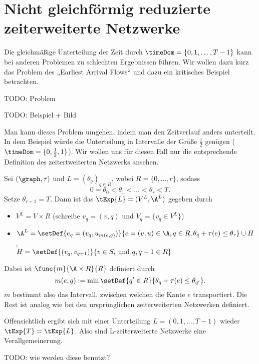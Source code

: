 \section{Nicht gleichförmig reduzierte zeiterweiterte Netzwerke}\label{sec:nonunif_cond}
Die gleichmäßige Unterteilung der Zeit durch $\timeDom = \{0,1, \ldots, T-1\}$ kann bei
anderen Problemen zu schlechten Ergebnissen führen. Wir wollen dazu kurz das Problem
des „Earliest Arrival Flows“ und dazu ein kritisches Beispiel betrachten.

TODO: Problem

TODO: Beispiel + Bild

Man kann dieses Problem umgehen, indem man den Zeitverlauf anders unterteilt. In dem
Beispiel würde die Unterteilung in Intervalle der Größe $\frac{1}{2}$
genügen ($\timeDom = \{0, \frac{1}{2}, 1\}$). Wir wollen uns für diesen Fall nur
die entsprechende Definition des zeitertweiterten Netzwerks ansehen.

\begin{definition}
    Sei $(\graph, \tau)$ und $L = (\theta_q)_{q \in R}$, wobei $R = \{0, \ldots, r\}$,
    sodass
    \[
        0 = \theta_0 < \theta_1 < \ldots < \theta_r < T.
    \]
    Setze $\theta_{r+1} = T$.
    Dann ist das  $\tExp{L} = (V^L, \A^L)$
    gegeben durch
    \begin{itemize}
        \item $V^L = V \times R$ (schreibe $v_q = (v, q)$ und
            $V_q = \{v_q \in V^L\}$)
        \item $\A^L = \setDef{e_q = (v_q, u_{m(e, q)})}
                        {e = (v, u) \in \A, q \in R, \theta_q + \tau(e) \leq \theta_r}
                    \cup H$, \\
             $H = \setDef{(v_q, v_{q+1})}
                                    {v \in S_i \text{ und } q, q+1 \in R}$
    \end{itemize}

    Dabei ist $\func{m}{\A \times R}{R}$ definiert durch
    \[
        m(e, q) := \min \setDef{q' \in R}{\theta_q + \tau(e) \leq \theta_{q'}}.
    \]
    $m$ bestimmt also das Intervall, zwischen welchen die Kante $e$ transportiert.
    Die Rest ist analog wie bei den ursprünglichen zeiterweiterten Netzwerken
    definiert.
\end{definition}

\begin{remark}
    Offensichtlich ergibt sich mit einer Unterteilung $L = (0, 1, \ldots, T-1)$
    wieder $\tExp{T} = \tExp{L}$. Also sind L-zeiterweiterte Netzwerke
    eine Verallgemeinerung.
\end{remark}

TODO: wie werden diese benutzt?
